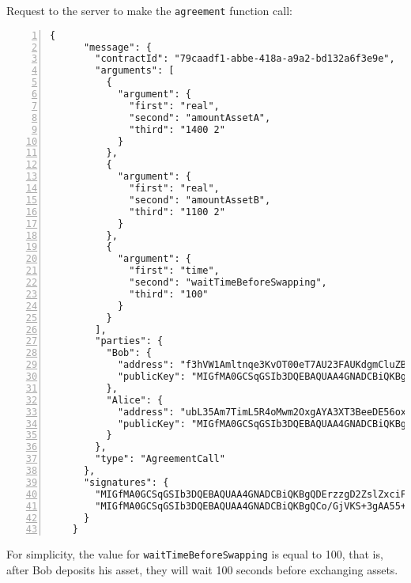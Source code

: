 Request to the server to make the \verb|agreement| function call:
{
  \small
  \begin{Verbatim}[numbers=left,xleftmargin=1cm,firstnumber=1,breaklines=true,breakanywhere=true,tabsize=2]
    {
      "message": {
        "contractId": "79caadf1-abbe-418a-a9a2-bd132a6f3e9e",
        "arguments": [
          {
            "argument": {
              "first": "real",
              "second": "amountAssetA",
              "third": "1400 2"
            }
          },
          {
            "argument": {
              "first": "real",
              "second": "amountAssetB",
              "third": "1100 2"
            }
          },
          {
            "argument": {
              "first": "time",
              "second": "waitTimeBeforeSwapping",
              "third": "100"
            }
          }
        ],
        "parties": {
          "Bob": {
            "address": "f3hVW1Amltnqe3KvOT00eT7AU23FAUKdgmCluZB+nss=",
            "publicKey": "MIGfMA0GCSqGSIb3DQEBAQUAA4GNADCBiQKBgQDErzzgD2ZslZxciFAiX3/ot7lrkZDw4148jFZrsDZPE6CVs9xXFSHGgy/mFvIFLXhnChO6Nyd2be3lbgeavLMCMVUiTStXr117Km17keWpb3sItkKKsLFBOcIIU8XXowI/OhzQN2XPZYESHgjdQ5vwEj2YyueiS7WKP94YWz/pswIDAQAB"
          },
          "Alice": {
            "address": "ubL35Am7TimL5R4oMwm2OxgAYA3XT3BeeDE56oxqdLc=",
            "publicKey": "MIGfMA0GCSqGSIb3DQEBAQUAA4GNADCBiQKBgQCo/GjVKS+3gAA55+kko41yINdOcCLQMSBQyuTTkKHE1mhu/TgOpivM0wLPsSga8hQMr3+v3aR0IF/vfCRf6SdiXmWx/jflmEXtnT6fkGcnV6dGNUpHWXSpwUIDt0N88jfnEqekx4S+KDCKg99sGEeHeT65fKS8lB0gjHMt9AOriwIDAQAB"
          }
        },
        "type": "AgreementCall"
      },
      "signatures": {
        "MIGfMA0GCSqGSIb3DQEBAQUAA4GNADCBiQKBgQDErzzgD2ZslZxciFAiX3/ot7lrkZDw4148jFZrsDZPE6CVs9xXFSHGgy/mFvIFLXhnChO6Nyd2be3lbgeavLMCMVUiTStXr117Km17keWpb3sItkKKsLFBOcIIU8XXowI/OhzQN2XPZYESHgjdQ5vwEj2YyueiS7WKP94YWz/pswIDAQAB": "Wrqyz5udZAGarLbSlxhYD+Ur6+EqTCFiwqBHEL2IsO5Y23Yxv14O3UzknrwK41L5LPUgVxR3K75AAZ4n+UcUdDNHlm9KHN7rqpsbe7v3yK2q8Qkk6c4IYNPDRFy3Zw62HH94O7tx8CzcvRfdX4fi+RItf4Fa7hb8Ui/crxDEQN8=",
        "MIGfMA0GCSqGSIb3DQEBAQUAA4GNADCBiQKBgQCo/GjVKS+3gAA55+kko41yINdOcCLQMSBQyuTTkKHE1mhu/TgOpivM0wLPsSga8hQMr3+v3aR0IF/vfCRf6SdiXmWx/jflmEXtnT6fkGcnV6dGNUpHWXSpwUIDt0N88jfnEqekx4S+KDCKg99sGEeHeT65fKS8lB0gjHMt9AOriwIDAQAB": "o/bdsudfHdR4BBd9EVaGYikksIezSEdwhHELH/f7xRD9g4uokO5g8wHph6LOht5dt9Y+dYt+Qrt+zNZzGUP8a50R7WB2gNz0Jn3zndKnVoBVhsda/zEwIA2pqccP2Sda7zCYiFTfgnmlUZZZfxjtLazBUzDE/vVVFcwtXAHYMXk="
      }
    }
  \end{Verbatim}
}

For simplicity, the value for \verb|waitTimeBeforeSwapping| is equal to 100, that is, after Bob deposits 
his asset, they will wait 100 seconds before exchanging assets.


